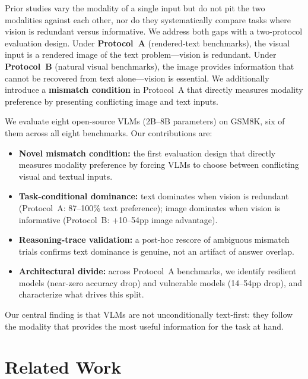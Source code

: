 \documentclass[11pt]{article}
\begin{document}
Prior studies vary the modality of a single input but do not pit the two modalities against each other, nor do they systematically compare tasks where vision is redundant versus informative. We address both gaps with a two-protocol evaluation design. Under \textbf{Protocol~A} (rendered-text benchmarks), the visual input is a rendered image of the text problem---vision is redundant. Under \textbf{Protocol~B} (natural visual benchmarks), the image provides information that cannot be recovered from text alone---vision is essential. We additionally introduce a \textbf{mismatch condition} in Protocol~A that directly measures modality preference by presenting conflicting image and text inputs.

We evaluate eight open-source VLMs (2B--8B parameters) on GSM8K, six of them across all eight benchmarks. Our contributions are:

\begin{itemize}
    \item \textbf{Novel mismatch condition:} the first evaluation design that directly measures modality preference by forcing VLMs to choose between conflicting visual and textual inputs.
    \item \textbf{Task-conditional dominance:} text dominates when vision is redundant (Protocol~A: 87--100\% text preference); image dominates when vision is informative (Protocol~B: +10--54pp image advantage).
    \item \textbf{Reasoning-trace validation:} a post-hoc rescore of ambiguous mismatch trials confirms text dominance is genuine, not an artifact of answer overlap.
    \item \textbf{Architectural divide:} across Protocol~A benchmarks, we identify resilient models (near-zero accuracy drop) and vulnerable models (14--54pp drop), and characterize what drives this split.
\end{itemize}

Our central finding is that VLMs are not unconditionally text-first: they follow the modality that provides the most useful information for the task at hand.

\section{Related Work}
\end{document}
